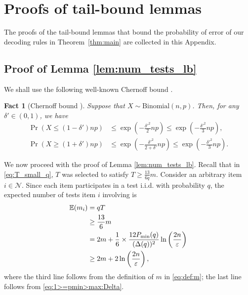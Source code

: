 \documentclass[onecolumn,letterpaper]{IEEEtran}
\newtheorem{fact}{Fact}
\newcommand{\cp}{{q}}
\newcommand{\nt}{{m}}
\newcommand{\nti}{{\nt_{i}}}
\newcommand{\pmin}{{P_{\min}(\cp)}}
\newcommand{\pgap}{{\Delta(\cp)}}
\begin{document}

\section{Proofs of tail-bound lemmas}\label{app:tail-bound}
The proofs of the tail-bound lemmas that bound the probability of error of our decoding rules in Theorem~\ref{thm:main} are collected in this Appendix.
\subsection{Proof of Lemma \ref{lem:num_tests_lb}}
\label{sec:num_tests_lb}

We shall use the following well-known Chernoff bound \cite{chernoff}.
\begin{fact}[Chernoff bound \cite{chernoff}]\label{chernoff_bound}
Suppose that $X \sim \text{Binomial}(n,p)$. Then, for any $\delta' \in (0,1)$, we have
\begin{equation} 
\begin{aligned}
    \Pr\left(X \le (1-\delta')np\right) &\leq \exp\left(-\frac{\delta'^2}{2} np \right) \leq \exp\left(-\frac{\delta'^2}{3} np \right), \\
    \Pr\left(X \ge (1+\delta')np\right) &\leq \exp\left(-\frac{\delta'^2}{2+\delta'} np \right) \le \exp\left(-\frac{\delta'^2}{3} np \right).
\end{aligned}
\end{equation}
\end{fact}



We now proceed with the proof of Lemma \ref{lem:num_tests_lb}. Recall that in \eqref{eq:T_small_q}, $T$ was selected to satisfy
$T \ge \frac{13}{6\cp} m$.
Consider an arbitrary item $i\in \mathcal{N}$. 
Since each item participates in a test i.i.d. with probability $\cp$,  
the expected number of tests item $i$ involving is
\begin{align}
    \mathbb{E}(\nti) &= \cp T \notag \\ 
    &\ge \frac{13}{6} \nt \notag \\ 
    &= 2\nt + \frac{1}{6} \times \frac{12\pmin}{(\pgap)^2} \ln \left( \frac{2n}{\varepsilon} \right) \notag\\
    &\ge 2\nt + 2\ln \left( \frac{2n}{\varepsilon} \right), \label{eq:ETi_4}
\end{align}
where the third line follows from the definition of $\nt$ in \eqref{eq:def:m}; the last line follows from \eqref{eq:1>=pmin>max:Delta}. 
\end{document}
